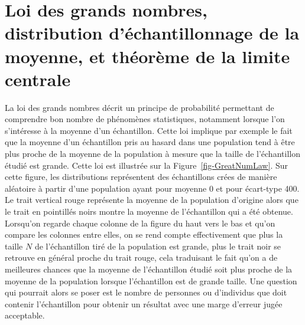 \documentclass[
  letterpaper,
]{book}
\begin{document}
\section{Loi des grands nombres, distribution d'échantillonnage de la
moyenne, et théorème de la limite
centrale}\label{loi-des-grands-nombres-distribution-duxe9chantillonnage-de-la-moyenne-et-thuxe9oruxe8me-de-la-limite-centrale}

La loi des grands nombres décrit un principe de probabilité permettant
de comprendre bon nombre de phénomènes statistiques, notamment lorsque
l'on s'intéresse à la moyenne d'un échantillon. Cette loi implique par
exemple le fait que la moyenne d'un échantillon pris au hasard dans une
population tend à être plus proche de la moyenne de la population à
mesure que la taille de l'échantillon étudié est grande. Cette loi est
illustrée sur la Figure~\ref{fig-GreatNumLaw}. Sur cette figure, les
distributions représentent des échantillons crées de manière aléatoire à
partir d'une population ayant pour moyenne 0 et pour écart-type 400. Le
trait vertical rouge représente la moyenne de la population d'origine
alors que le trait en pointillés noirs montre la moyenne de
l'échantillon qui a été obtenue. Lorsqu'on regarde chaque colonne de la
figure du haut vers le bas et qu'on compare les colonnes entre elles, on
se rend compte effectivement que plus la taille \(N\) de l'échantillon
tiré de la population est grande, plus le trait noir se retrouve en
général proche du trait rouge, cela traduisant le fait qu'on a de
meilleures chances que la moyenne de l'échantillon étudié soit plus
proche de la moyenne de la population lorsque l'échantillon est de
grande taille. Une question qui pourrait alors se poser est le nombre de
personnes ou d'individus que doit contenir l'échantillon pour obtenir un
résultat avec une marge d'erreur jugée acceptable.
\end{document}
